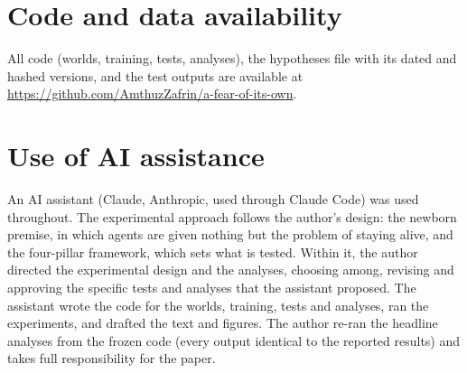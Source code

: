 \documentclass[11pt]{article}
\begin{document}
\section*{Code and data availability}
All code (worlds, training, tests, analyses), the hypotheses file with its dated and hashed versions, and the test outputs are available at \url{https://github.com/AmthuzZafrin/a-fear-of-its-own}.

\section*{Use of AI assistance}
An AI assistant (Claude, Anthropic, used through Claude Code) was used throughout. The experimental approach follows the author's design: the newborn premise, in which agents are given nothing but the problem of staying alive, and the four-pillar framework, which sets what is tested. Within it, the author directed the experimental design and the analyses, choosing among, revising and approving the specific tests and analyses that the assistant proposed. The assistant wrote the code for the worlds, training, tests and analyses, ran the experiments, and drafted the text and figures. The author re-ran the headline analyses from the frozen code (every output identical to the reported results) and takes full responsibility for the paper.
\end{document}
